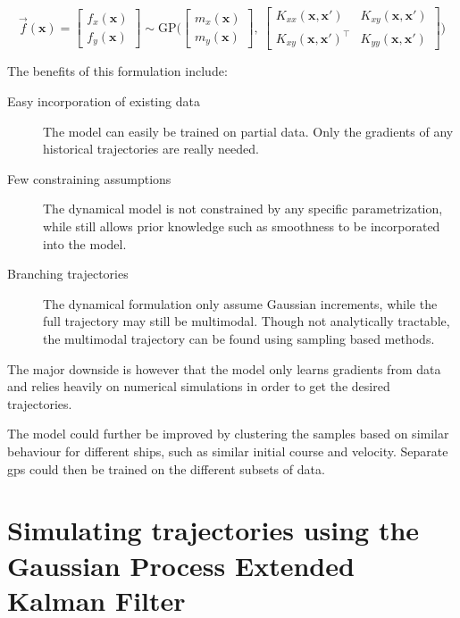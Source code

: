 \begin{equation}\label{eq:gp_vec_field}
    \vec{f}(\boldsymbol{x}) = \begin{bmatrix} f_x (\boldsymbol{x})\\ f_y (\boldsymbol{x})\end{bmatrix} \sim \text{GP} \big(\begin{bmatrix} m_x(\boldsymbol{x})\\m_y(\boldsymbol{x})\end{bmatrix}, \ \begin{bmatrix}
            K_{xx}(\boldsymbol{x}, \boldsymbol{x}') & K_{xy}(\boldsymbol{x}, \boldsymbol{x}') \\ K_{xy}(\boldsymbol{x}, \boldsymbol{x}')^\intercal & K_{yy}(\boldsymbol{x}, \boldsymbol{x}')
        \end{bmatrix}\big)
\end{equation}

The benefits of this formulation include:
\begin{description}
    \item[Easy incorporation of existing data] The model can easily be trained on partial data. Only the gradients of any historical trajectories are really needed.
    \item[Few constraining assumptions] The dynamical model is not constrained by any specific parametrization, while still allows prior knowledge such as smoothness to be incorporated into the model.
    \item[Branching trajectories] The dynamical formulation only assume Gaussian increments, while the full trajectory may still be multimodal. Though not analytically tractable, the multimodal trajectory can be found using sampling based methods.
\end{description}

The major downside is however that the model only learns gradients from data and relies heavily on numerical simulations in order to get the desired trajectories.

The model could further be improved by clustering the samples based on similar behaviour for different ships, such as similar initial course and velocity. Separate \acrshort{gp}s could then be trained on the different subsets of data.

\section{Simulating trajectories using the Gaussian Process Extended Kalman Filter}


